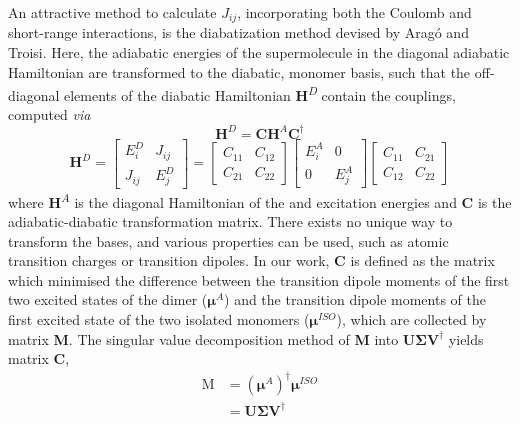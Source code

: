 An attractive method to calculate $J_{ij}$, incorporating both the Coulomb and short-range interactions, is the diabatization method devised by Arag\'o and Troisi. Here, the adiabatic energies of the supermolecule in the diagonal adiabatic Hamiltonian are transformed to the diabatic, monomer basis, such that the off-diagonal elements of the diabatic Hamiltonian \textbf{H}\textsuperscript{\textit{D}} contain the couplings, computed \textit{via}
\begin{equation}
\textbf{H}^{D}=\textbf{C}\textbf{H}^{A}\textbf{C}^\dag
\label{equation: diabatic hamiltonian}
\end{equation}
\begin{equation}
\label{equation: diabatic matrix}
\textbf{H}^D=
\begin{bmatrix}
E_{i}^D & J_{ij}\\
J_{ij} & E_{j}^D
\end{bmatrix}
=
\begin{bmatrix}
C_{11} & C_{12}\\
C_{21} & C_{22}
\end{bmatrix}
\begin{bmatrix}
E_{i}^A & 0\\
0 & E_{j}^A
\end{bmatrix}
\begin{bmatrix}
C_{11} & C_{21}\\
C_{12} & C_{22}
\end{bmatrix}
\end{equation} 
where \textbf{H}\textsuperscript{\textit{A}} is the diagonal Hamiltonian of the \sone{} and \stwo{} excitation energies and \textbf{C} is the adiabatic-diabatic transformation matrix. There exists no unique way to transform the bases, and various properties can be used, such as atomic transition charges or transition dipoles. In our work, \textbf{C} is defined as the matrix which minimised the difference between the transition dipole moments of the first two excited states of the dimer ($\bm{\mu}^{A}$) and the transition dipole moments of the first excited state of the two isolated monomers ($\bm{\mu}^{ISO}$), which are collected by matrix \textbf{M}. The singular value decomposition method of \textbf{M} into $\bm{U\Sigma{}V}^{\dag}$ yields matrix \textbf{C},
\begin{equation}
\begin{split}
    \bm{\mathrm{M}}&=(\bm{\mu}^{A})^{\dag}\bm{\mu}^{ISO}\\
    &=\bm{U\Sigma{}V}^{\dag}
    \end{split}
\end{equation}
